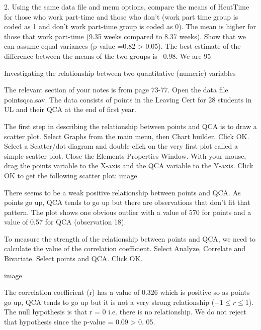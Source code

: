  
 
2. Using the same data file and menu options, compare the means of HcutTime for those who work part-time and those who don’t (work part time group is coded as 1 and don’t work part-time group is coded as 0). The mean is higher for those that work part-time (9.35 weeks compared to 8.37 weeks). Show that we can assume equal variances (p-value =0.82 > 0.05). The best estimate of the difference between the means of the two groups is –0.98. We are 95%
 
 
 
Investigating the relationship between two quantitative (numeric) variables
 
The relevant section of your notes is from page 73-77. Open the data file pointsqca.sav. The data consists of points in the Leaving Cert for 28 students in UL and their QCA at the end of first year.
 
 
 
The first step in describing the relationship between points and QCA is to draw a scatter plot. Select Graphs from the main menu, then Chart builder.
Click OK. Select a Scatter/dot diagram and double click on the very first plot called a simple scatter plot. Close the Elements Properties Window. With your mouse, drag the points variable to the X-axis and the QCA variable to the Y-axis. Click OK to get the following scatter plot:
image
 
There seems to be a weak positive relationship between points and QCA. As points go up, QCA tends to go up but there are observations that don’t fit that pattern. The plot shows one obvious outlier with a value of 570 for points and a value of 0.57 for QCA (observation 18).
 
To measure the strength of the relationship between points and QCA, we need to calculate the value of the correlation coefficient. Select Analyze, Correlate and Bivariate. Select points and QCA. Click OK.
 
image
 
 
 
The correlation coefficient (r) has a value of 0.326 which is positive so as points go up, QCA tends to go up but it is not a very strong relationship ($-1 \leq r \leq 1$). The null hypothesis is that r = 0 i.e. there is no relationship. We do not reject that hypothesis since the p-value = 0.09 > 0. 05.
 
